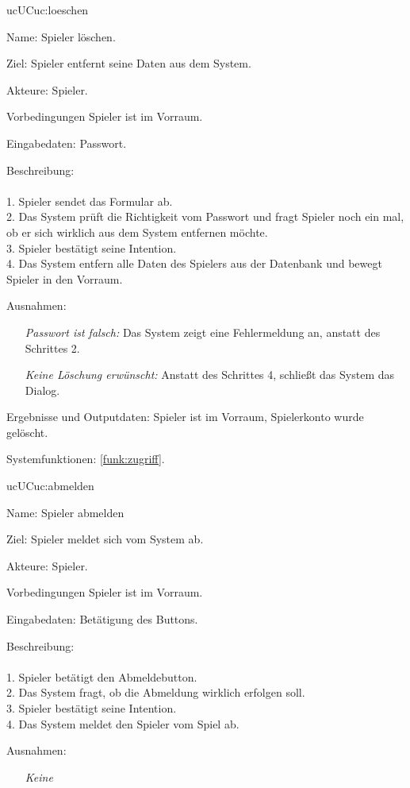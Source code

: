 \begin{description}[leftmargin=5em, style=sameline]
	\begin{lhp}{uc}{UC}{uc:loeschen}
		\item [Name:] Spieler löschen.
		\item [Ziel:] Spieler entfernt seine Daten aus dem System.
		\item [Akteure:] Spieler.
		\item [Vorbedingungen] Spieler ist im Vorraum.
		\item [Eingabedaten:] Passwort.
		\item [Beschreibung:] \hfill\\ \hfill\\
				1. Spieler sendet das Formular ab.\\
				2. Das System prüft die Richtigkeit vom Passwort und fragt Spieler noch ein mal, ob er sich wirklich aus dem System entfernen möchte.\\
				3. Spieler bestätigt seine Intention.\\
				4. Das System entfern alle Daten des Spielers aus der Datenbank und bewegt Spieler in den Vorraum.\\
		\item [Ausnahmen:] \hfill
			\begin{itemize} 
				\item[] \textit{Passwort ist falsch:} Das System zeigt eine Fehlermeldung an, anstatt des Schrittes 2.
				\item[] \textit{Keine Löschung erwünscht:} Anstatt des Schrittes 4, schließt das System das Dialog.
				
			\end{itemize}
		\item [Ergebnisse und Outputdaten:] Spieler ist im Vorraum, Spielerkonto wurde gelöscht.	
		\item [Systemfunktionen:] \ref{funk:zugriff}.
	\end{lhp}

	\begin{lhp}{uc}{UC}{uc:abmelden}
		\item [Name:] Spieler abmelden
		\item [Ziel:] Spieler meldet sich vom System ab.
		\item [Akteure:] Spieler.
		\item [Vorbedingungen] Spieler ist im Vorraum.
		\item [Eingabedaten:] Betätigung des Buttons. 
		\item [Beschreibung:] \hfill\\ \hfill\\
			1. Spieler betätigt den Abmeldebutton.\\
			2. Das System fragt, ob die Abmeldung wirklich erfolgen soll.\\
			3. Spieler bestätigt seine Intention.\\
			4. Das System meldet den Spieler vom Spiel ab.\\
		\item [Ausnahmen:] \hfill
			\begin{itemize} 
				\item[] \textit{Keine} 
		

\end{itemize}
\end{lhp}
\end{description}
